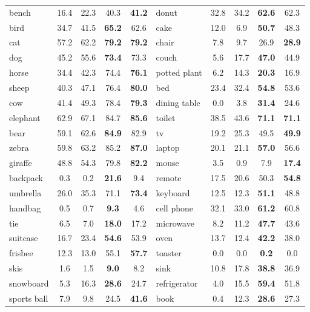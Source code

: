 \documentclass[11pt]{article}
\begin{document}
\begin{table*}[t]
\begin{scriptsize}
\begin{tabular}{
    p{} c c c c | p{} c c c c}
    bench & 16.4 & 22.3 & 40.3 & \textbf{41.2} & donut & 32.8 & 34.2 & \textbf{62.6} & 62.3 \\
    bird & 34.7 & 41.5 & \textbf{65.2} & 62.6 & cake & 12.0 & 6.9 & \textbf{50.7} & 48.3 \\
    cat & 57.2 & 62.2 & \textbf{79.2} & \textbf{79.2} & chair & 7.8 & 9.7 & 26.9 & \textbf{28.9} \\
    dog & 45.2 & 55.6 & \textbf{73.4} & 73.3 & couch & 5.6 & 17.7 & \textbf{47.0} & 44.9 \\
    horse & 34.4 & 42.3 & 74.4 & \textbf{76.1} & potted plant & 6.2 & 14.3 & \textbf{20.3} & 16.9 \\
    sheep & 40.3 & 47.1 & 76.4 & \textbf{80.0} & bed & 23.4 & 32.4 & \textbf{54.8} & 53.6 \\
    cow & 41.4 & 49.3 & 78.4 & \textbf{79.3} & dining table & 0.0 & 3.8 & \textbf{31.4} & 24.6 \\
    elephant & 62.9 & 67.1 & 84.7 & \textbf{85.6} & toilet & 38.5 & 43.6 & \textbf{71.1} & \textbf{71.1} \\
    bear & 59.1 & 62.6 & \textbf{84.9} & 82.9 & tv & 19.2 & 25.3 & 49.5 & \textbf{49.9} \\
    zebra & 59.8 & 63.2 & 85.2 & \textbf{87.0} & laptop & 20.1 & 21.1 & \textbf{57.0} & 56.6 \\
    giraffe & 48.8 & 54.3 & 79.8 & \textbf{82.2} & mouse & 3.5 & 0.9 & 7.9 & \textbf{17.4} \\
    backpack & 0.3 & 0.2 & \textbf{21.6} & 9.4 & remote & 17.5 & 20.6 & 50.3 & \textbf{54.8} \\
    umbrella & 26.0 & 35.3 & 71.1 & \textbf{73.4} & keyboard & 12.5 & 12.3 & \textbf{51.1} & 48.8 \\
    handbag & 0.5 & 0.7 & \textbf{9.3} & 4.6 & cell phone & 32.1 & 33.0 & \textbf{61.2} & 60.8 \\
    tie & 6.5 & 7.0 & \textbf{18.0} & 17.2 & microwave & 8.2 & 11.2 & \textbf{47.7} & 43.6 \\
    suitcase & 16.7 & 23.4 & \textbf{54.6} & 53.9 & oven & 13.7 & 12.4 & \textbf{42.2} & 38.0 \\
    frisbee & 12.3 & 13.0 & 55.1 & \textbf{57.7} & toaster & 0.0 & 0.0 & \textbf{0.2} & 0.0 \\
    skis & 1.6 & 1.5 & \textbf{9.0} & 8.2 & sink & 10.8 & 17.8 & \textbf{38.8} & 36.9 \\
    snowboard & 5.3 & 16.3 & \textbf{28.6} & 24.7 & refrigerator & 4.0 & 15.5 & \textbf{59.4} & 51.8 \\
    sports ball & 7.9 & 9.8 & 24.5 & \textbf{41.6} & book & 0.4 & 12.3 & \textbf{28.6} & 27.3 \\

\end{tabular}
\end{scriptsize}
\end{table*}
\end{document}
